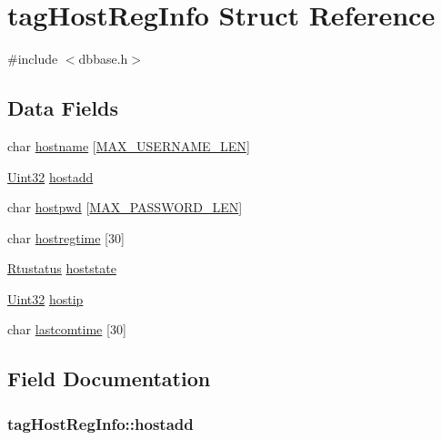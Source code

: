 \hypertarget{structtagHostRegInfo}{\section{tag\-Host\-Reg\-Info Struct Reference}
\label{structtagHostRegInfo}
}


{\ttfamily \#include $<$dbbase.\-h$>$}

\subsection*{Data Fields}
\begin{DoxyCompactItemize}
\item 
char \hyperlink{structtagHostRegInfo_ab4fe64f1918035127e4977ac86acbe6c}{hostname} \mbox{[}\hyperlink{dbbase_8h_a6c4647395896246d6710ba980c31666c}{M\-A\-X\-\_\-\-U\-S\-E\-R\-N\-A\-M\-E\-\_\-\-L\-E\-N}\mbox{]}
\item 
\hyperlink{base_8h_a60cf7b3c038ce37a50796e8eaddf0b5f}{Uint32} \hyperlink{structtagHostRegInfo_a0a941433455480139877222fceae14bc}{hostadd}
\item 
char \hyperlink{structtagHostRegInfo_a702b798e536ea634c0461b4531838fb2}{hostpwd} \mbox{[}\hyperlink{dbbase_8h_ae9169c3fda2dfecbb7a13e394a69e5be}{M\-A\-X\-\_\-\-P\-A\-S\-S\-W\-O\-R\-D\-\_\-\-L\-E\-N}\mbox{]}
\item 
char \hyperlink{structtagHostRegInfo_a67b9defe16ece9949ecb12f428b32d0c}{hostregtime} \mbox{[}30\mbox{]}
\item 
\hyperlink{dbbase_8h_a78dcbe2d7ae67051ae97baded9edcb05}{Rtustatus} \hyperlink{structtagHostRegInfo_af0ae6c8e57b3b55df0da95e89e9e1753}{hoststate}
\item 
\hyperlink{base_8h_a60cf7b3c038ce37a50796e8eaddf0b5f}{Uint32} \hyperlink{structtagHostRegInfo_a1a17617b6989380b3aa0b92ff39f28ec}{hostip}
\item 
char \hyperlink{structtagHostRegInfo_a8f4c2089786e0113934f3ecd7c588319}{lastcomtime} \mbox{[}30\mbox{]}
\end{DoxyCompactItemize}


\subsection{Field Documentation}
\hypertarget{structtagHostRegInfo_a0a941433455480139877222fceae14bc}{
\subsubsection[{hostadd}]{ tag\-Host\-Reg\-Info\-::hostadd}}\label{structtagHostRegInfo_a0a941433455480139877222fceae14bc}


